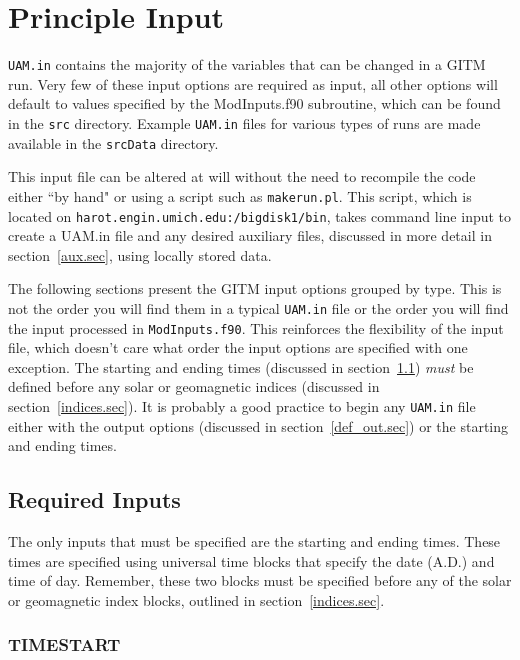 \section{Principle Input}
\label{uam.sec}

{\tt UAM.in} contains the majority of the variables that can be changed in a GITM run.  Very few of these input options are required as input, all other options will default to values specified by the ModInputs.f90 subroutine, which can be found in the {\tt src} directory.  Example {\tt UAM.in} files for various types of runs are made available in the {\tt srcData} directory.

This input file can be altered at will without the need to recompile the code either ``by hand" or using a script such as {\tt makerun.pl}.  This script, which is located on {\tt harot.engin.umich.edu:/bigdisk1/bin}, takes command line input to create a UAM.in file and any desired auxiliary files, discussed in more detail in section~\ref{aux.sec}, using locally stored data.

The following sections present the GITM input options grouped by type.  This is not the order you will find them in a typical {\tt UAM.in} file or the order you will find the input processed in {\tt ModInputs.f90}.  This reinforces the flexibility of the input file, which doesn't care what order the input options are specified with one exception.  The starting and ending times (discussed in section~\ref{required.sec}) \textit{must} be defined before any solar or geomagnetic indices (discussed in section~\ref{indices.sec}).  It is probably a good practice to begin any {\tt UAM.in} file either with the output options (discussed in section~\ref{def_out.sec}) or the starting and ending times.


\subsection{Required Inputs}
\label{required.sec}

The only inputs that must be specified are the starting and ending times.  These times are specified using universal time blocks that specify the date (A.D.) and time of day.  Remember, these two blocks must be specified before any of the solar or geomagnetic index blocks, outlined in section~\ref{indices.sec}.

\subsubsection{TIMESTART}
\label{starttime.sec}

